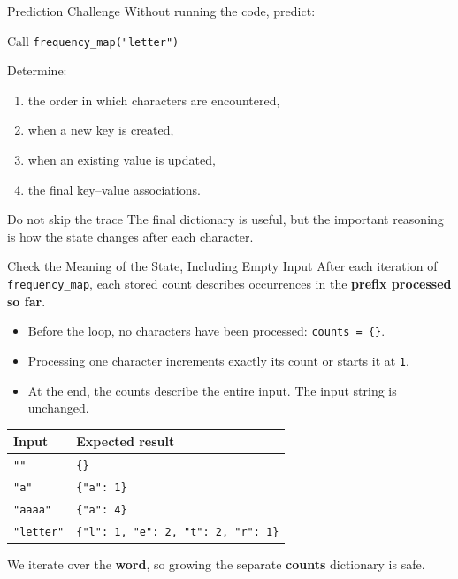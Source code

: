\documentclass[aspectratio=169,10pt]{beamer}
\begin{document}
\begin{frame}{Prediction Challenge}
  Without running the code, predict:

  \begin{block}{Call}
    \centering
    \texttt{frequency\_map("letter")}
  \end{block}

  Determine:
  \begin{enumerate}
    \item the order in which characters are encountered,
    \item when a new key is created,
    \item when an existing value is updated,
    \item the final key--value associations.
  \end{enumerate}

  \begin{alertblock}{Do not skip the trace}
    The final dictionary is useful, but the important reasoning is how the state changes after each character.
  \end{alertblock}
\end{frame}


\begin{frame}{Check the Meaning of the State, Including Empty Input}
  \small
  After each iteration of \texttt{frequency\_map}, each stored count describes occurrences in the \textbf{prefix processed so far}.
  \begin{itemize}
    \item Before the loop, no characters have been processed: \texttt{counts = \{\}}.
    \item Processing one character increments exactly its count or starts it at \texttt{1}.
    \item At the end, the counts describe the entire input. The input string is unchanged.
  \end{itemize}
  \begin{center}
    \renewcommand{\arraystretch}{1.2}
    \begin{tabular}{l|l}
      \textbf{Input} & \textbf{Expected result} \\\hline
      \texttt{""} & \texttt{\{\}} \\
      \texttt{"a"} & \texttt{\{"a": 1\}} \\
      \texttt{"aaaa"} & \texttt{\{"a": 4\}} \\
      \texttt{"letter"} & \texttt{\{"l": 1, "e": 2, "t": 2, "r": 1\}}
    \end{tabular}
  \end{center}
  We iterate over the \textbf{word}, so growing the separate \textbf{counts} dictionary is safe.
\end{frame}
\end{document}
